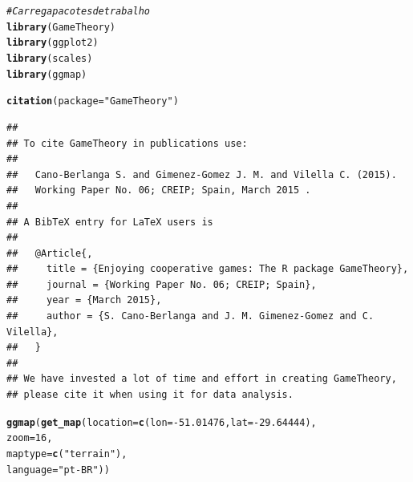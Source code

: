 \documentclass[
	article,			        %
	11pt,				          %
	oneside,			        %
	a4paper,			        %
	english,			        %
	brazil,				        %
	sumario=tradicional
]{abntex2}\usepackage[]{graphicx}\usepackage[]{color}
\makeatletter
\newcommand{\hlnum}[1]{\textcolor[rgb]{0.686,0.059,0.569}{#1}}%
\newcommand{\hlstr}[1]{\textcolor[rgb]{0.192,0.494,0.8}{#1}}%
\newcommand{\hlcom}[1]{\textcolor[rgb]{0.678,0.584,0.686}{\textit{#1}}}%
\newcommand{\hlopt}[1]{\textcolor[rgb]{0,0,0}{#1}}%
\newcommand{\hlstd}[1]{\textcolor[rgb]{0.345,0.345,0.345}{#1}}%
\newcommand{\hlkwc}[1]{\textcolor[rgb]{0.333,0.667,0.333}{#1}}%
\newcommand{\hlkwd}[1]{\textcolor[rgb]{0.737,0.353,0.396}{\textbf{#1}}}%
\newenvironment{kframe}{%
 \def\at@end@of@kframe{}%
 \ifinner\ifhmode%
  \def\at@end@of@kframe{\end{minipage}}%
  \begin{minipage}{\columnwidth}%
 \fi\fi%
 \def\FrameCommand##1{\hskip\@totalleftmargin \hskip-\fboxsep
 \colorbox{shadecolor}{##1}\hskip-\fboxsep
     \hskip-\linewidth \hskip-\@totalleftmargin \hskip\columnwidth}%
 \MakeFramed {\advance\hsize-\width
   \@totalleftmargin\z@ \linewidth\hsize
   \@setminipage}}%
 {\par\unskip\endMakeFramed%
 \at@end@of@kframe}
\newenvironment{knitrout}{}{} %
\makeatother
\begin{document}
\begin{knitrout}
\color{fgcolor}\begin{kframe}
\begin{alltt}
\hlcom{# Carrega pacotes de trabalho}
\hlkwd{library}\hlstd{(GameTheory)}
\hlkwd{library}\hlstd{(ggplot2)}
\hlkwd{library}\hlstd{(scales)}
\hlkwd{library}\hlstd{(ggmap)}

\hlkwd{citation}\hlstd{(}\hlkwc{package} \hlstd{=} \hlstr{"GameTheory"}\hlstd{)}
\end{alltt}
\begin{verbatim}
## 
## To cite GameTheory in publications use:
## 
##   Cano-Berlanga S. and Gimenez-Gomez J. M. and Vilella C. (2015).
##   Working Paper No. 06; CREIP; Spain, March 2015 .
## 
## A BibTeX entry for LaTeX users is
## 
##   @Article{,
##     title = {Enjoying cooperative games: The R package GameTheory},
##     journal = {Working Paper No. 06; CREIP; Spain},
##     year = {March 2015},
##     author = {S. Cano-Berlanga and J. M. Gimenez-Gomez and C. Vilella},
##   }
## 
## We have invested a lot of time and effort in creating GameTheory,
## please cite it when using it for data analysis.
\end{verbatim}
\begin{alltt}
\hlkwd{ggmap}\hlstd{(}\hlkwd{get_map}\hlstd{(}\hlkwc{location} \hlstd{=} \hlkwd{c}\hlstd{(}\hlkwc{lon} \hlstd{=} \hlopt{-}\hlnum{51.01476}\hlstd{,} \hlkwc{lat} \hlstd{=} \hlopt{-}\hlnum{29.64444}\hlstd{),}
              \hlkwc{zoom} \hlstd{=} \hlnum{16}\hlstd{,}
              \hlkwc{maptype} \hlstd{=} \hlkwd{c}\hlstd{(}\hlstr{"terrain"}\hlstd{),}
              \hlkwc{language} \hlstd{=} \hlstr{"pt-BR"}\hlstd{))}
\end{alltt}
\end{kframe}
\end{knitrout}
\end{document}

